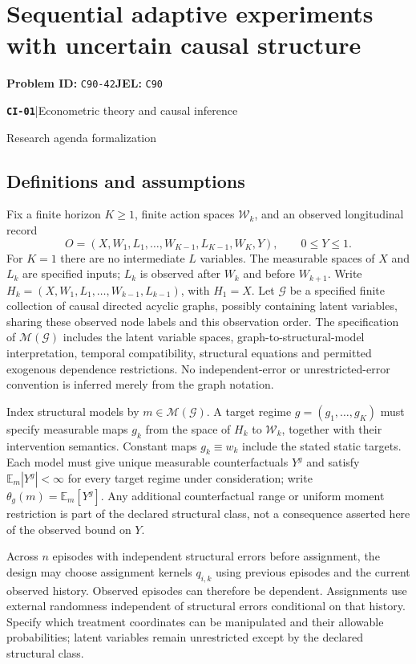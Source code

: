 \documentclass[11pt,a4paper]{article}
\newcommand{\E}{\mathbb E}
\newcommand{\entrymeta}[3]{{\sffamily\small\color{muted}\textbf{\texttt{#1}}\quad|\quad #2\par #3\par}}
\begin{document}
\section*{Sequential adaptive experiments with uncertain causal structure}
\textbf{Problem ID:} \texttt{C90-42}\quad \textbf{JEL:} \texttt{C90}\par
\label{problem:OP-0480}
\label{beyond:CI-01}
\entrymeta{CI-01}{Econometric theory and causal inference}{Research agenda formalization}
\subsection*{Definitions and assumptions}
Fix a finite horizon $K\geq1$, finite action spaces $\mathcal W_k$, and an observed longitudinal record
\[
 O=(X,W_1,L_1,\ldots,W_{K-1},L_{K-1},W_K,Y),\qquad 0\leq Y\leq1.
\]
For $K=1$ there are no intermediate $L$ variables. The measurable spaces of $X$ and $L_k$ are specified inputs; $L_k$ is observed after $W_k$ and before $W_{k+1}$. Write $H_k=(X,W_1,L_1,\ldots,W_{k-1},L_{k-1})$, with $H_1=X$. Let $\mathcal G$ be a specified finite collection of causal directed acyclic graphs, possibly containing latent variables, sharing these observed node labels and this observation order. The specification of $\mathcal M(\mathcal G)$ includes the latent variable spaces, graph-to-structural-model interpretation, temporal compatibility, structural equations and permitted exogenous dependence restrictions. No independent-error or unrestricted-error convention is inferred merely from the graph notation.

Index structural models by $m\in\mathcal M(\mathcal G)$. A target regime $g=(g_1,\ldots,g_K)$ must specify measurable maps $g_k$ from the space of $H_k$ to $\mathcal W_k$, together with their intervention semantics. Constant maps $g_k\equiv w_k$ include the stated static targets. Each model must give unique measurable counterfactuals $Y^g$ and satisfy $\E_m|Y^g|<\infty$ for every target regime under consideration; write $\theta_g(m)=\E_m[Y^g]$. Any additional counterfactual range or uniform moment restriction is part of the declared structural class, not a consequence asserted here of the observed bound on $Y$.

Across $n$ episodes with independent structural errors before assignment, the design may choose assignment kernels $q_{i,k}$ using previous episodes and the current observed history. Observed episodes can therefore be dependent. Assignments use external randomness independent of structural errors conditional on that history. Specify which treatment coordinates can be manipulated and their allowable probabilities; latent variables remain unrestricted except by the declared structural class.
\end{document}

